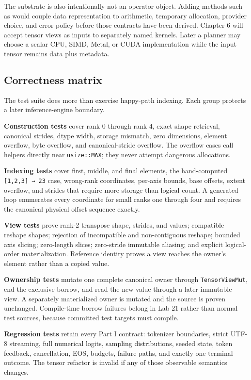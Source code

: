 \documentclass[
  10pt,
]{article}
\begin{document}
The substrate is also intentionally not an operator object. Adding
methods such as \texttt{} would couple
data representation to arithmetic, temporary allocation, provider
choice, and error policy before those contracts have been derived.
Chapter 6 will accept tensor views as inputs to separately named
kernels. Later a planner may choose a scalar CPU, SIMD, Metal, or CUDA
implementation while the input tensor remains data plus metadata.

\subsection{Correctness matrix}\label{correctness-matrix}

The test suite does more than exercise happy-path indexing. Each group
protects a later inference-engine boundary.

\textbf{Construction tests} cover rank 0 through rank 4, exact shape
retrieval, canonical strides, dtype width, storage mismatch, zero
dimensions, element overflow, byte overflow, and canonical-stride
overflow. The overflow cases call helpers directly near
\texttt{usize::MAX}; they never attempt dangerous allocations.

\textbf{Indexing tests} cover first, middle, and final elements, the
hand-computed \texttt{{[}1,2,3{]}\ →\ 23} case, wrong-rank coordinates,
per-axis bounds, base offsets, extent overflow, and strides that require
more storage than logical count. A generated loop enumerates every
coordinate for small ranks one through four and requires the canonical
physical offset sequence exactly.

\textbf{View tests} prove rank-2 transpose shape, strides, and values;
compatible reshape shapes; rejection of incompatible and non-contiguous
reshape; bounded axis slicing; zero-length slices; zero-stride immutable
aliasing; and explicit logical-order materialization. Reference identity
proves a view reaches the owner's element rather than a copied value.

\textbf{Ownership tests} mutate one complete canonical owner through
\texttt{TensorViewMut}, end the exclusive borrow, and read the new value
through a later immutable view. A separately materialized owner is
mutated and the source is proven unchanged. Compile-time borrow failures
belong in Lab 21 rather than normal test sources, because committed test
targets must compile.

\textbf{Regression tests} retain every Part I contract: tokenizer
boundaries, strict UTF-8 streaming, full numerical logits, sampling
distributions, seeded state, token feedback, cancellation, EOS, budgets,
failure paths, and exactly one terminal outcome. The tensor refactor is
invalid if any of those observable semantics changes.
\end{document}
